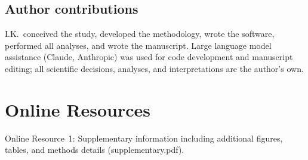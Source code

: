 \documentclass[12pt]{article}
\begin{document}
\subsection*{Author contributions}
I.K.\ conceived the study, developed the methodology, wrote the software, performed all analyses, and wrote the manuscript. Large language model assistance (Claude, Anthropic) was used for code development and manuscript editing; all scientific decisions, analyses, and interpretations are the author's own.




\section*{Online Resources}

Online Resource~1: Supplementary information including additional figures, tables, and methods details (supplementary.pdf).
\end{document}
